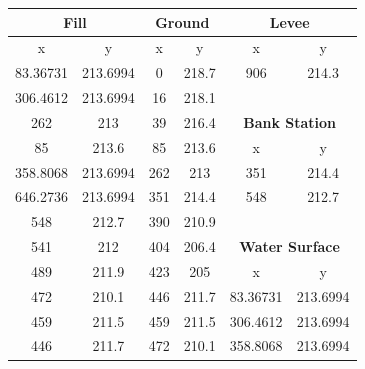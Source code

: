 \begin{center}

\begin{tabular}{|cc||cc||cc|} 
    \hline
    \multicolumn{2}{|c||}{\textbf{Fill }} & \multicolumn{2}{c||}{\textbf{Ground }} & \multicolumn{2}{c|}{\textbf{Levee }}           \\ 
    \hline
    x        & y                         & x    & y                              & x        & y                                   \\
    83.36731 & 213.6994                  & 0    & 218.7                          & 906      & 214.3                               \\
    306.4612 & 213.6994                  & 16   & 218.1                          &          &                                     \\
    262      & 213                       & 39   & 216.4                          & \multicolumn{2}{c|}{\textbf{Bank Station }}    \\ 
    \cline{5-6}
    85       & 213.6                     & 85   & 213.6                          & x        & y                                   \\
    358.8068 & 213.6994                  & 262  & 213                            & 351      & 214.4                               \\
    646.2736 & 213.6994                  & 351  & 214.4                          & 548      & 212.7                               \\
    548      & 212.7                     & 390  & 210.9                          &          &                                     \\
    541      & 212                       & 404  & 206.4                          & \multicolumn{2}{c|}{\textbf{Water Surface }}   \\ 
    \cline{5-6}
    489      & 211.9                     & 423  & 205                            & x        & y                                   \\
    472      & 210.1                     & 446  & 211.7                          & 83.36731 & 213.6994                            \\
    459      & 211.5                     & 459  & 211.5                          & 306.4612 & 213.6994                            \\
    446      & 211.7                     & 472  & 210.1                          & 358.8068 & 213.6994                            \\

\end{tabular}
\end{center}
